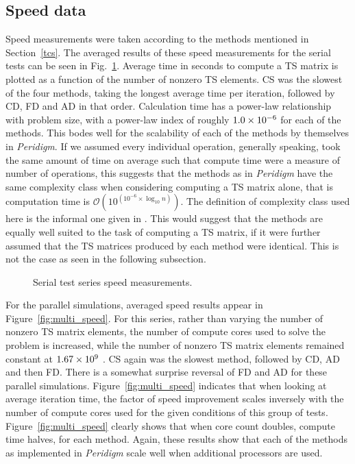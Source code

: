 \documentclass[preprint,12pt]{elsarticle}
\begin{document}
\subsection{Speed data} 
%
Speed measurements were taken according to the methods mentioned in Section~\ref{tcs}. The averaged results of these speed measurements for the serial tests can be seen in Fig.~\ref{fig:serial_speed}.  Average time in seconds to compute a TS matrix is plotted as a function of the number of nonzero TS elements.  CS was the slowest of the four methods, taking the longest average time per iteration, followed by CD, FD and AD in that order. Calculation time has a power-law relationship with problem size, with a power-law index of roughly $\num{1.0E-6}$ for each of the methods. This bodes well for the scalability of each of the methods by themselves in \emph{Peridigm}. If we assumed every individual operation, generally speaking, took the same amount of time on average such that compute time were a measure of number of operations, this suggests that the methods as in \emph{Peridigm} have the same complexity class when considering computing a TS matrix alone, that is computation time is $\mathcal{O}(10^{(10^{-6} \times \log_{10}n)})$. The definition of complexity class used here is the informal one given in \cite[pp. 1059]{cormen2009introduction}. This would suggest that the methods are equally well suited to the task of computing a TS matrix, if it were further assumed that the TS matrices produced by each method were identical. This is not the case as seen in the following subsection.
%
\begin{figure}[tbp] 
    \centering 
    \scalebox{0.93}{}
    \caption{Serial test series speed measurements.} 
    \label{fig:serial_speed}
\end{figure}
%
For the parallel simulations, averaged speed results appear in Figure~\ref{fig:multi_speed}. For this series, rather than varying the number of nonzero TS matrix elements, the number of compute cores used to solve the problem is increased, while the number of nonzero TS matrix elements remained constant at $\num{1.67E9}$ .  CS again was the slowest method, followed by CD, AD and then FD.  There is a somewhat surprise reversal of FD and AD for these parallel simulations.  Figure~\ref{fig:multi_speed} indicates that when looking at average iteration time, the factor of speed improvement scales inversely with the number of compute cores used for the given conditions of this group of tests. Figure~\ref{fig:multi_speed} clearly shows that when core count doubles, compute time halves, for each method. Again, these results show that each of the methods as implemented in \emph{Peridigm} scale well when additional processors are used. 
\end{document}
